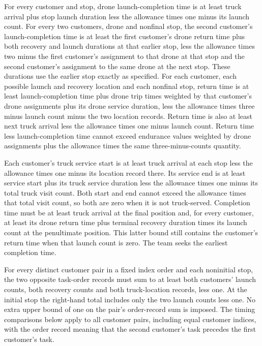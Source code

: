 \documentclass[10pt]{article}
\begin{document}
For every customer and stop, drone launch-completion time is at least truck arrival plus stop launch duration less the allowance times one minus its launch count. For every two customers, drone and nonfinal stop, the second customer's launch-completion time is at least the first customer's drone return time plus both recovery and launch durations at that earlier stop, less the allowance times two minus the first customer's assignment to that drone at that stop and the second customer's assignment to the same drone at the next stop. These durations use the earlier stop exactly as specified. For each customer, each possible launch and recovery location and each nonfinal stop, return time is at least launch-completion time plus drone trip times weighted by that customer's drone assignments plus its drone service duration, less the allowance times three minus launch count minus the two location records. Return time is also at least next truck arrival less the allowance times one minus launch count. Return time less launch-completion time cannot exceed endurance values weighted by drone assignments plus the allowance times the same three-minus-counts quantity.

Each customer's truck service start is at least truck arrival at each stop less the allowance times one minus its location record there. Its service end is at least service start plus its truck service duration less the allowance times one minus its total truck visit count. Both start and end cannot exceed the allowance times that total visit count, so both are zero when it is not truck-served. Completion time must be at least truck arrival at the final position and, for every customer, at least its drone return time plus terminal recovery duration times its launch count at the penultimate position. This latter bound still contains the customer's return time when that launch count is zero. The team seeks the earliest completion time.

For every distinct customer pair in a fixed index order and each noninitial stop, the two opposite task-order records must sum to at least both customers' launch counts, both recovery counts and both truck-location records, less one. At the initial stop the right-hand total includes only the two launch counts less one. No extra upper bound of one on the pair's order-record sum is imposed. The timing comparisons below apply to all customer pairs, including equal customer indices, with the order record meaning that the second customer's task precedes the first customer's task.
\end{document}
